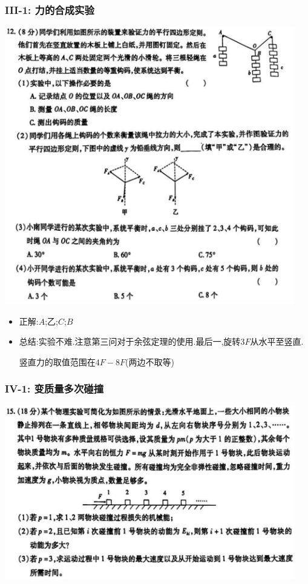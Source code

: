\documentclass{article}
\begin{document}
\subsubsection{III-1: 力的合成实验}
\includegraphics[width=0.95\textwidth,keepaspectratio]{./pictures/3.13-4.png}

\begin{itemize}
    \item 正解:\quad $A$;乙;$C$;$B$
    \item 总结:\quad 实验不难.注意第三问对于余弦定理的使用.最后一,旋转$3F$从水平至竖直.
    
    \hspace{3.2em}竖直力的取值范围在$4F - 8F$(两边不取等)    
\end{itemize}


\vspace{2em}

\subsubsection{IV-1: 变质量多次碰撞}
\includegraphics[width=0.95\textwidth,keepaspectratio]{./pictures/3.13-5.png}
\end{document}
